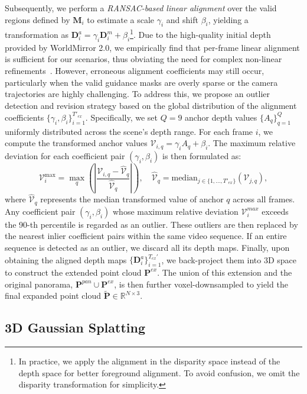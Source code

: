 \documentclass{article} %
\begin{document}
Subsequently, we perform a \textit{RANSAC-based linear alignment} over the valid regions defined by $\mathbf{M}_i$ to estimate a scale $\gamma_i$ and shift $\beta_i$, yielding a transformation as $\mathbf{D}^a_i=\gamma_i\mathbf{D}^m_i+\beta_i$\footnote{In practice, we apply the alignment in the disparity space instead of the depth space for better foreground alignment. To avoid confusion, we omit the disparity transformation for simplicity.}.
Due to the high-quality initial depth provided by WorldMirror 2.0, we empirically find that per-frame linear alignment is sufficient for our scenarios, thus obviating the need for complex non-linear refinements~\cite{ren2025gen3c,hollein2026world}.
However, erroneous alignment coefficients may still occur, particularly when the valid guidance masks are overly sparse or the camera trajectories are highly challenging. 
To address this, we propose an outlier detection and revision strategy based on the global distribution of the alignment coefficients $\{\gamma_i,\beta_i\}_{i=1}^{T'_{ex}}$. 
Specifically, we set $Q=9$ anchor depth values $\{A_q\}_{q=1}^{Q}$ uniformly distributed across the scene's depth range. For each frame $i$, we compute the transformed anchor values $\mathcal{V}_{i,q}=\gamma_i A_q+\beta_i$.
The maximum relative deviation for each coefficient pair $(\gamma_i,\beta_i)$ is then formulated as:
\begin{equation}
\mathcal{V}_i^{\max}=\max\limits_{q}\left(\left|\frac{\mathcal{V}_{i,q}-\hat{\mathcal{V}}_q}{\hat{\mathcal{V}}_q}\right|\right),\quad
\hat{\mathcal{V}}_q=\mathrm{median}_{j\in\{1,...,T'_{ex}\}}(\mathcal{V}_{j,q}),
\label{eq_max_rel_dev}
\end{equation}
where $\hat{\mathcal{V}}_q$ represents the median transformed value of anchor $q$ across all frames.
Any coefficient pair $(\gamma_i,\beta_i)$ whose maximum relative deviation $\mathcal{V}_{i}^{max}$ exceeds the 90-th percentile is regarded as an outlier.
These outliers are then replaced by the nearest inlier coefficient pairs within the same video sequence.
If an entire sequence is detected as an outlier, we discard all its depth maps.
Finally, upon obtaining the aligned depth maps $\{\mathbf{D}^a_i\}_{i=1}^{T_{ex}'}$,
we back-project them into 3D space to construct the extended point cloud $\mathbf{P}^{ex}$. The union of this extension and the original panorama, $\mathbf{P}^{pan}\cup\mathbf{P}^{ex}$, is then further voxel-downsampled to yield the final expanded point cloud $\mathbf{\tilde{P}}\in\mathbb{R}^{N\times 3}$.

\subsection{3D Gaussian Splatting}
\label{sec:3dgs}
\end{document}
